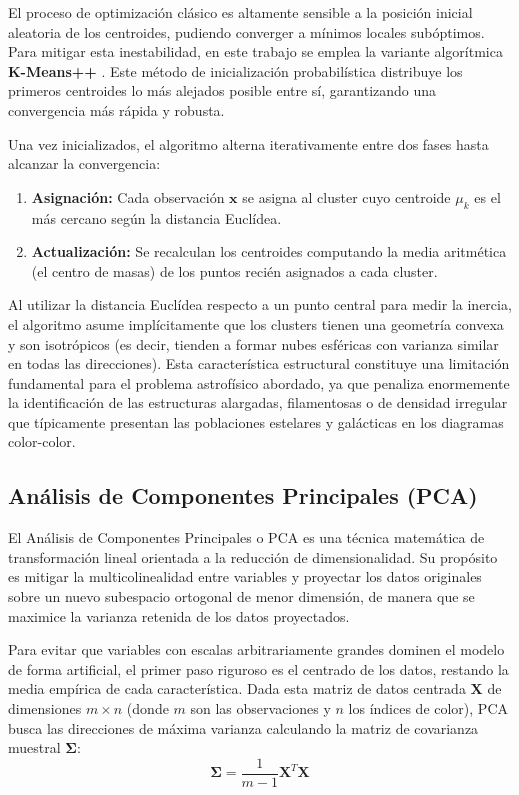 \documentclass[12pt, a4paper]{report}
\begin{document}
El proceso de optimización clásico es altamente sensible a la posición inicial aleatoria de los centroides, pudiendo converger a mínimos locales subóptimos. Para mitigar esta inestabilidad, en este trabajo se emplea la variante algorítmica \textbf{K-Means++} \citep{arthur2007}. Este método de inicialización probabilística distribuye los primeros centroides lo más alejados posible entre sí, garantizando una convergencia más rápida y robusta.

Una vez inicializados, el algoritmo alterna iterativamente entre dos fases hasta alcanzar la convergencia:
\begin{enumerate}
    \item \textbf{Asignación:} Cada observación $\mathbf{x}$ se asigna al cluster cuyo centroide $\mu_k$ es el más cercano según la distancia Euclídea.
    \item \textbf{Actualización:} Se recalculan los centroides computando la media aritmética (el centro de masas) de los puntos recién asignados a cada cluster.
\end{enumerate}

Al utilizar la distancia Euclídea respecto a un punto central para medir la inercia, el algoritmo asume implícitamente que los clusters tienen una geometría convexa y son isotrópicos (es decir, tienden a formar nubes esféricas con varianza similar en todas las direcciones). Esta característica estructural constituye una limitación fundamental para el problema astrofísico abordado, ya que penaliza enormemente la identificación de las estructuras alargadas, filamentosas o de densidad irregular que típicamente presentan las poblaciones estelares y galácticas en los diagramas color-color.

\subsection{Análisis de Componentes Principales (PCA)}

El Análisis de Componentes Principales o PCA \citep{pearson1901, jolliffe2002} es una técnica matemática de transformación lineal orientada a la reducción de dimensionalidad. Su propósito es mitigar la multicolinealidad entre variables y proyectar los datos originales sobre un nuevo subespacio ortogonal de menor dimensión, de manera que se maximice la varianza retenida de los datos proyectados.

Para evitar que variables con escalas arbitrariamente grandes dominen el modelo de forma artificial, el primer paso riguroso es el centrado de los datos, restando la media empírica de cada característica. Dada esta matriz de datos centrada $\mathbf{X}$ de dimensiones $m \times n$ (donde $m$ son las observaciones y $n$ los índices de color), PCA busca las direcciones de máxima varianza calculando la matriz de covarianza muestral $\mathbf{\Sigma}$:
\begin{equation}
    \mathbf{\Sigma} = \frac{1}{m-1} \mathbf{X}^T \mathbf{X}
\end{equation}
\end{document}
